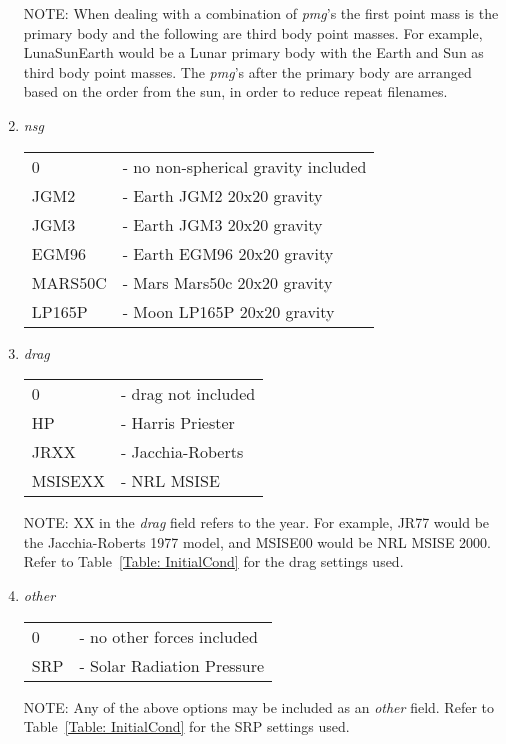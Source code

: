 \begin{enumerate}
NOTE:  When dealing with a combination of \emph{pmg}'s the first
point mass is the primary body and the following are third body
point masses. For example, LunaSunEarth would be a Lunar primary
body with the Earth and Sun as third body point masses. The
\emph{pmg}'s after the primary body are arranged based on the order
from the sun, in order to reduce repeat filenames.

  \item \emph{nsg}

  \begin{tabular}{ll}
    0       & - no non-spherical gravity included \\
    JGM2    & - Earth JGM2 20x20 gravity \\
    JGM3    & - Earth JGM3 20x20 gravity \\
    EGM96   & - Earth EGM96 20x20 gravity \\
    MARS50C & - Mars Mars50c 20x20 gravity\\
    LP165P  & - Moon LP165P 20x20 gravity\\
   \end{tabular}
  \item \emph{drag}

  \begin{tabular}{ll}
    0 & - drag not included\\
    HP & - Harris Priester \\
    JRXX & - Jacchia-Roberts\\
    MSISEXX & - NRL MSISE\\
  \end{tabular}

NOTE:  XX in the \emph{drag} field refers to the year.  For example,
JR77 would be the Jacchia-Roberts 1977 model, and MSISE00 would be
NRL MSISE 2000. Refer to Table~\ref{Table: InitialCond} for the drag
settings used.

  \item \emph{other}

  \begin{tabular}{ll}
    0 & - no other forces included\\
    SRP & - Solar Radiation Pressure\\
  \end{tabular}

NOTE:  Any of the above options may be included as an \emph{other}
field.  Refer to Table~\ref{Table: InitialCond} for the SRP settings
used.

\end{enumerate}
